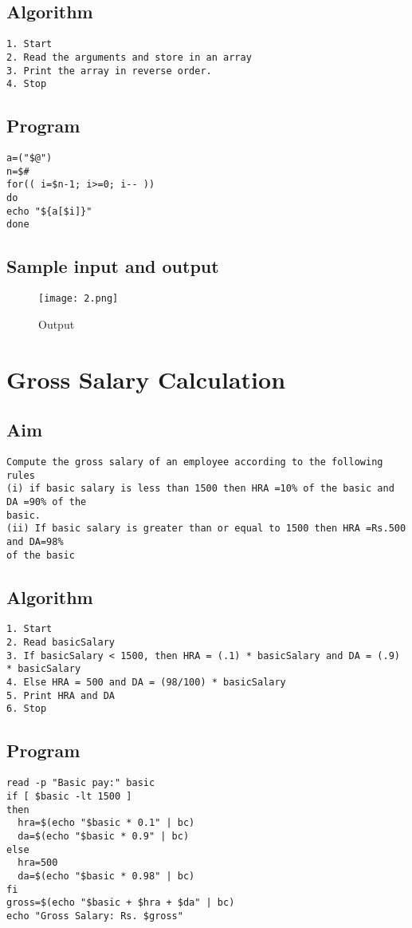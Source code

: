 \documentclass{article}
\begin{document}
\subsection{Algorithm}
\begin{Verbatim}[tabsize = 4]
1. Start
2. Read the arguments and store in an array
3. Print the array in reverse order.
4. Stop
\end{Verbatim}
\subsection{Program}
\begin{Verbatim}[tabsize = 4]
a=("$@")
n=$#
for(( i=$n-1; i>=0; i-- ))
do
echo "${a[$i]}"
done
\end{Verbatim}
\subsection{Sample input and output}
\begin{figure}[H]
    \centering
    \texttt{[image: 2.png]}
    \caption{Output}
    \label{fig:my_label2}
\end{figure}
\section{\Large Gross Salary Calculation}
\subsection{Aim}
\begin{Verbatim}[tabsize = 4]
Compute the gross salary of an employee according to the following rules
(i) if basic salary is less than 1500 then HRA =10% of the basic and DA =90% of the 
basic. 
(ii) If basic salary is greater than or equal to 1500 then HRA =Rs.500 and DA=98% 
of the basic
\end{Verbatim}
\newpage
\subsection{Algorithm}
\begin{Verbatim}[tabsize = 4]
1. Start
2. Read basicSalary
3. If basicSalary < 1500, then HRA = (.1) * basicSalary and DA = (.9) * basicSalary
4. Else HRA = 500 and DA = (98/100) * basicSalary
5. Print HRA and DA
6. Stop
\end{Verbatim}
\subsection{Program}
\begin{Verbatim}[tabsize = 4]
read -p "Basic pay:" basic
if [ $basic -lt 1500 ]
then
  hra=$(echo "$basic * 0.1" | bc)
  da=$(echo "$basic * 0.9" | bc)
else
  hra=500
  da=$(echo "$basic * 0.98" | bc)
fi
gross=$(echo "$basic + $hra + $da" | bc)
echo "Gross Salary: Rs. $gross"
\end{Verbatim}
\thispagestyle{third}
\end{document}
